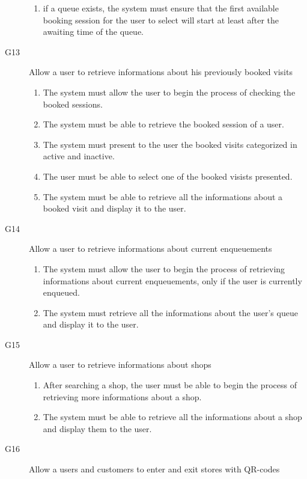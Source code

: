 \begin{description}
\begin{enumerate}[resume*]
            \item if a queue exists, the system must ensure that the first available booking session for the user to select will start at least after the awaiting time of the queue.
        \end{enumerate}
    \item [G13] Allow a user to retrieve informations about his previously booked visits
        \begin{enumerate}[resume*]
            \item The system must allow the user to begin the process of checking the booked sessions.
            \item The system must be able to retrieve the booked session of a user.
            \item The system must present to the user the booked visits categorized in active and inactive.
            \item The user must be able to select one of the booked visists presented.
            \item The system must be able to retrieve all the informations about a booked visit and display it to the user.
        \end{enumerate}
    \item [G14] Allow a user to retrieve informations about current enqueuements
        \begin{enumerate}[resume*]
            \item The system must allow the user to begin the process of retrieving informations about current enqueuements, only if the user is currently enqueued.
            \item The system must retrieve all the informations about the user's queue and display it to the user.
        \end{enumerate}
    \item [G15] Allow a user to retrieve informations about shops 
        \begin{enumerate}[resume*]
            \item After searching a shop, the user must be able to begin the process of retrieving more informations about a shop.
            \item The system must be able to retrieve all the informations about a shop and display them to the user.
        \end{enumerate}
    \item [G16] Allow a users and customers to enter and exit stores with QR-codes
        \begin{enumerate}[resume*]

\end{enumerate}
\end{description}
